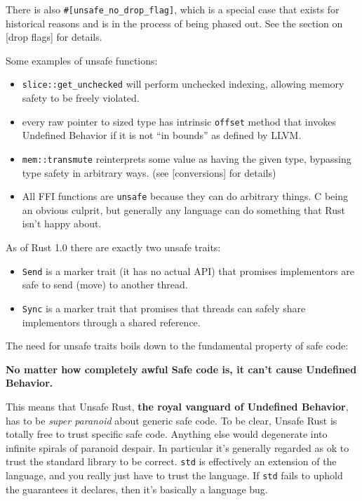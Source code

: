 \documentclass[a4paper,]{book}
\begin{document}
There is also \texttt{\#{[}unsafe\_no\_drop\_flag{]}}, which is a
special case that exists for historical reasons and is in the process of
being phased out. See the section on {[}drop flags{]} for details.

Some examples of unsafe functions:

\begin{itemize}
\itemsep1pt\parskip0pt
\item
  \texttt{slice::get\_unchecked} will perform unchecked indexing,
  allowing memory safety to be freely violated.
\item
  every raw pointer to sized type has intrinsic \texttt{offset} method
  that invokes Undefined Behavior if it is not ``in bounds'' as defined
  by LLVM.
\item
  \texttt{mem::transmute} reinterprets some value as having the given
  type, bypassing type safety in arbitrary ways. (see {[}conversions{]}
  for details)
\item
  All FFI functions are \texttt{unsafe} because they can do arbitrary
  things. C being an obvious culprit, but generally any language can do
  something that Rust isn't happy about.
\end{itemize}

As of Rust 1.0 there are exactly two unsafe traits:

\begin{itemize}
\itemsep1pt\parskip0pt
\item
  \texttt{Send} is a marker trait (it has no actual API) that promises
  implementors are safe to send (move) to another thread.
\item
  \texttt{Sync} is a marker trait that promises that threads can safely
  share implementors through a shared reference.
\end{itemize}

The need for unsafe traits boils down to the fundamental property of
safe code:

\textbf{No matter how completely awful Safe code is, it can't cause
Undefined Behavior.}

This means that Unsafe Rust, \textbf{the royal vanguard of Undefined
Behavior}, has to be \emph{super paranoid} about generic safe code. To
be clear, Unsafe Rust is totally free to trust specific safe code.
Anything else would degenerate into infinite spirals of paranoid
despair. In particular it's generally regarded as ok to trust the
standard library to be correct. \texttt{std} is effectively an extension
of the language, and you really just have to trust the language. If
\texttt{std} fails to uphold the guarantees it declares, then it's
basically a language bug.
\end{document}
